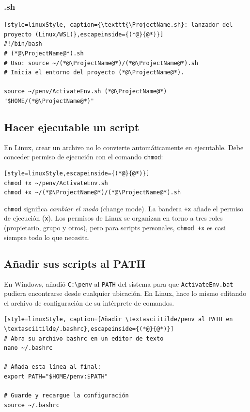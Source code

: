\subsubsection{\ProjectName{}.sh}

\begin{lstlisting}[style=linuxStyle, caption={\texttt{\ProjectName.sh}: lanzador del proyecto (Linux/WSL)},escapeinside={(*@}{@*)}]
#!/bin/bash
# (*@\ProjectName@*).sh
# Uso: source ~/(*@\ProjectName@*)/(*@\ProjectName@*).sh
# Inicia el entorno del proyecto (*@\ProjectName@*).

source ~/penv/ActivateEnv.sh (*@\ProjectName@*) "$HOME/(*@\ProjectName@*)"
\end{lstlisting}

\subsection{Hacer ejecutable un script}
\label{sec:chmod}

En Linux, crear un archivo no lo convierte automáticamente en ejecutable.
Debe conceder permiso de ejecución con el comando \texttt{chmod}:

\begin{lstlisting}[style=linuxStyle,escapeinside={(*@}{@*)}]
chmod +x ~/penv/ActivateEnv.sh
chmod +x ~/(*@\ProjectName@*)/(*@\ProjectName@*).sh
\end{lstlisting}

\texttt{chmod} significa \emph{cambiar el modo} (change mode). La bandera
\texttt{+x} añade el permiso de ejecución (\texttt{x}). Los permisos de
Linux se organizan en torno a tres roles (propietario, grupo y otros),
pero para scripts personales, \texttt{chmod +x} es casi siempre todo lo
que necesita.

\subsection{Añadir sus scripts al PATH}

En Windows, añadió \texttt{C:\textbackslash penv} al \texttt{PATH} del
sistema para que \texttt{ActivateEnv.bat} pudiera encontrarse desde
cualquier ubicación. En Linux, hace lo mismo editando el archivo de
configuración de su intérprete de comandos.

\begin{lstlisting}[style=linuxStyle, caption={Añadir \textasciitilde/penv al PATH en \textasciitilde/.bashrc},escapeinside={(*@}{@*)}]
# Abra su archivo bashrc en un editor de texto
nano ~/.bashrc

# Añada esta línea al final:
export PATH="$HOME/penv:$PATH"

# Guarde y recargue la configuración
source ~/.bashrc
\end{lstlisting}

